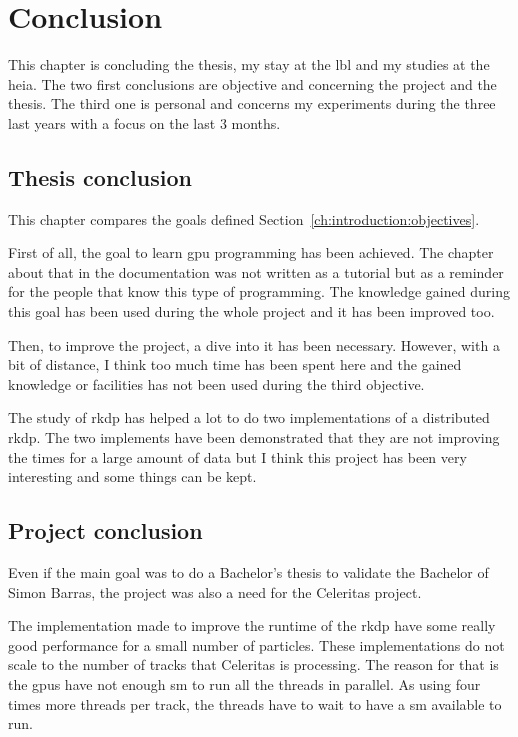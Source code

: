 \chapter{Conclusion}
\label{ch:conclusion}

This chapter is concluding the thesis, my stay at the \acrshort{lbl} and my
studies at the \acrshort{heia}.
The two first conclusions are objective and concerning the project and the thesis.
The third one is personal and concerns my experiments during the three last
years with a focus on the last 3 months.


\section{Thesis conclusion}
\label{ch:conclusion:thesis}

This chapter compares the goals defined Section~\ref{ch:introduction:objectives}.

First of all, the goal to learn \acrshort{gpu} programming has been achieved.
The chapter about that in the documentation was not written as a tutorial but
as a reminder for the people that know this type of programming.
The knowledge gained during this goal has been used during the whole project
and it has been improved too.

Then, to improve the project, a dive into it has been necessary.
However, with a bit of distance, I think too much time has been spent here and
the gained knowledge or facilities has not been used during the third objective.

The study of \acrshort{rkdp} has helped a lot to do two implementations of a
distributed \acrshort{rkdp}.
The two implements have been demonstrated that they are not improving the times for
a large amount of data but I think this project has been very interesting and
some things can be kept.

\section{Project conclusion}
\label{ch:conclusion:project}

Even if the main goal was to do a Bachelor's thesis to validate the Bachelor of
Simon Barras, the project was also a need for the Celeritas project.

The implementation made to improve the runtime of the \acrshort{rkdp} have some
really good performance for a small number of particles.
These implementations do not scale to the number of tracks that Celeritas is processing.
The reason for that is the \acrshort{gpu}s have not enough \acrshort{sm} to run
all the threads in parallel.
As using four times more threads per track, the threads have to wait to have a
\acrshort{sm} available to run.

